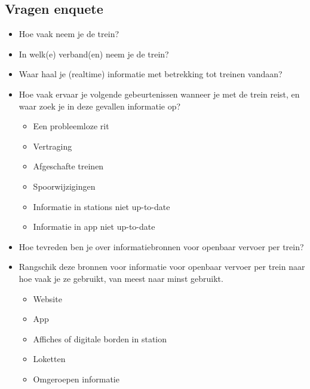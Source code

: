 \begin{appendices}
\chapter{Vragen enquete}
\label{appendix:enquete}

\begin{itemize}
	
	
	\item Hoe vaak neem je de trein?
	\item In welk(e) verband(en) neem je de trein?
	\item Waar haal je (realtime) informatie met betrekking tot treinen vandaan?
	\item Hoe vaak ervaar je volgende gebeurtenissen wanneer je met de trein reist, en waar zoek je in deze gevallen informatie op?
	\begin{itemize}
		\item Een probleemloze rit
		\item Vertraging
		\item Afgeschafte treinen
		\item Spoorwijzigingen
		\item Informatie in stations niet up-to-date
		\item Informatie in app niet up-to-date
	\end{itemize}
	
	\item Hoe tevreden ben je over informatiebronnen voor openbaar vervoer per trein?
	\item Rangschik deze bronnen voor informatie voor openbaar vervoer per trein naar hoe vaak je ze gebruikt, van meest naar minst gebruikt.
	\begin{itemize}
		\item Website
		\item App
		\item Affiches of digitale borden in station
		\item Loketten
		\item Omgeroepen informatie
	\end{itemize}
	

\end{itemize}
\end{appendices}
